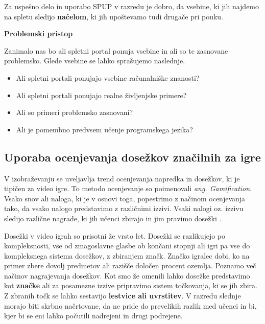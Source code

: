 Za uspešno delo in uporabo SPUP v razredu je dobro, da vsebine, ki jih
najdemo na spletu sledijo \textbf{načelom}, ki jih upoštevamo tudi
drugače pri pouku.



\textbf{Problemski pristop}



Zanimalo nas bo ali spletni portal ponuja vsebine in ali so te
zasnovane problemsko. Glede vsebine se lahko sprašujemo naslednje.

\begin{itemize}
\tightlist
\item Ali spletni portali ponujajo vsebine računalniške znanosti?
\item Ali spletni portali ponujajo realne življenjske primere?
\item Ali so primeri problemsko zasnovani?
\item Ali je pomembno predvsem učenje programskega jezika?
\end{itemize}

\subsection{Uporaba ocenjevanja dosežkov značilnih za igre}
\label{sec:uporaba_dosežkov}

V izobraževanju se uveljavlja trend ocenjevanja napredka in dosežkov,
ki je tipičen za video igre. To metodo ocenjevanje so poimenovali
\emph{ang. Gamification}. Vsako snov ali naloga, ki je v osnovi toga,
popestrimo z načinom ocenjevanja tako, da vsako nalogo predstavimo z
različnimi izzivi. Vsaki nalogi oz. izzivu sledijo različne nagrade,
ki jih učenci zbirajo in jim pravimo dosežki \cite{web:edublogger}.

Dosežki v video igrah so prisotni že vrsto let. Dosežki se razlikujejo
po kompleksnosti, vse od zmagoslavne glasbe ob končani stopnji ali
igri pa vse do kompleksnega sistema dosežkov, z zbiranjem
značk. Značko igralec dobi, ko na primer zbere dovolj predmetov ali
razišče določen procent ozemlja. Poznamo več načinov nagrajevanja
dosežkov. Kot smo že omenili lahko dosežke predstavimo kot
\textbf{značke} ali za posamezne izzive pripravimo sistem točkovanja,
ki se jih zbira. Z zbranih točk se lahko sestavijo \textbf{lestvice
  ali uvrstitev}. V razredu slednje morajo biti skrbno načrtovane, da
ne pride do prevelikih razlik med učenci in bi, kjer bi se eni lahko
počutili nadrejeni in drugi podrejene.

